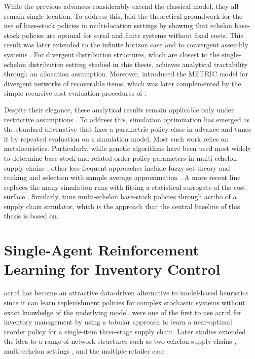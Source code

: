 While the previous advances considerably extend the classical model, they all remain single-location. To address this, \citet{clark1960multiechelon} laid the theoretical groundwork for the use of base-stock policies in multi-location settings by showing that echelon base-stock policies are optimal for serial and finite systems without fixed costs. This result was later extended to the infinite horizon case \citep{federgruen1984multiechelon} and to
convergent assembly systems \citep{rosling1989multiechelon}. For divergent distribution
structures, which are closest to the single-echelon distribution setting studied in this
thesis, \citet{eppen1981multiechelon} achieves analytical tractability through an allocation
assumption. Moreover, \citet{sherbrooke1968multiechelon} introduced the METRIC model for divergent networks of recoverable items, which was later complemented by the simple recursive cost-evaluation procedures of \citet{axsater1990multiechelon}.

Despite their elegance, these analytical results remain applicable only under restrictive assumptions \citep{dekok2018multiechelon}. To address this, simulation optimization has emerged as the standard alternative that
fixes a parametric policy class in advance and tunes it by repeated evaluation on a simulation model. Most such work relies on metaheuristics. Particularly, while genetic algorithms have been used most widely to determine base-stock and related order-policy parameters in multi-echelon supply chains \citep[e.g.,][]{kimbrough2002multiechelon, daniel2005multiechelon, daniel2006multiechelon}, other less-frequent approaches include fuzzy set theory \citep{petrovic1999multiechelon, giannoccaro2003multiechelon} and ranking and selection with sample average approximation \citep{tsai2013multiechelon}. A more recent line replaces the many simulation runs with fitting a statistical surrogate of the cost surface \citep[e.g.,][]{jalali2017kriging, liu2024surrogate}. Similarly, \citet{kiuchi2020bayesian} tune multi-echelon base-stock policies through \gls{acr:bo} of a supply chain simulator, which is the approach that the central baseline of this thesis is based on.\\


\section{Single-Agent Reinforcement Learning for Inventory Control}
\label{sec:rw-rl}
\gls{acr:rl} has become an attractive data-driven alternative to model-based heuristics since it can learn replenishment policies for complex stochastic systems without exact knowledge of the underlying model. \citet{giannoccaro2002inventory} were one of the first to use \gls{acr:rl} for inventory management by using a tabular approach to learn a near-optimal reorder policy for a single-item three-stage supply chain.
Later studies extended the idea to a range of network structures such as two-echelon supply chains \citep{kim2005adaptive, kim2008asynchronous}, multi-echelon settings \citep{chaharsooghi2008reinforcement, kwak2009situation, sun2012analyses}, and the multiple-retailer case \citep{dogan2015reinforcement}. 

